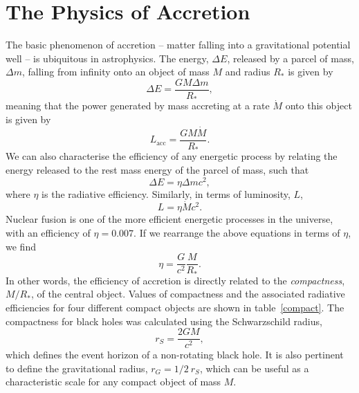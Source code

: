 \section{The Physics of Accretion}

The basic phenomenon of accretion -- 
matter falling into a gravitational potential well -- 
is ubiquitous in astrophysics. The energy, $\Delta E$, released by a parcel of 
mass, $\Delta m$, falling from infinity onto an object of mass $M$ and radius $R_*$
is given by
\begin{equation}
\Delta E = \frac{GM \Delta m}{R_*},
\label{eq:acc_energy}
\end{equation} 
meaning that the power generated by mass accreting at a rate $\dot{M}$ onto this
object is given by
\begin{equation}
L_{\mathrm{acc}} = \frac{GM \dot{M}}{R_*}.
\label{eq:acc_energy}
\end{equation} 
We can also characterise the efficiency of any energetic process by relating
the energy released to the rest mass energy of the parcel of mass, such that
\begin{equation}
\Delta E = \eta \Delta m c^2,
\label{eq:restmass}
\end{equation} 
where $\eta$ is the radiative efficiency. Similarly, in terms of luminosity, $L$,
\begin{equation}
L = \eta \dot{M} c^2.
\label{eq:restmass2}
\end{equation} 
Nuclear fusion is one of the more efficient
energetic processes in the universe, with an efficiency of
$\eta=0.007$. If we rearrange the above equations in terms of $\eta$, we find
\begin{equation}
\eta = \frac{G}{c^2} \frac{M}{R_*}.
\label{eq:eta}
\end{equation} 
In other words, the efficiency of accretion is directly related 
to the {\em compactness}, $M/R_*$, of the central object. 
Values of compactness and the associated radiative efficiencies 
for four different compact objects are shown in table~\ref{compact}. 
The compactness for black holes was calculated using the Schwarzschild radius,
\begin{equation}
r_S = \frac{2GM}{c^2},
\label{eq:eta}
\end{equation}
which defines the event horizon of a non-rotating black hole. It is also pertinent
to define the gravitational radius, $r_G = 1/2~r_S$, which can be useful as
a characteristic scale for any compact object of mass $M$.

